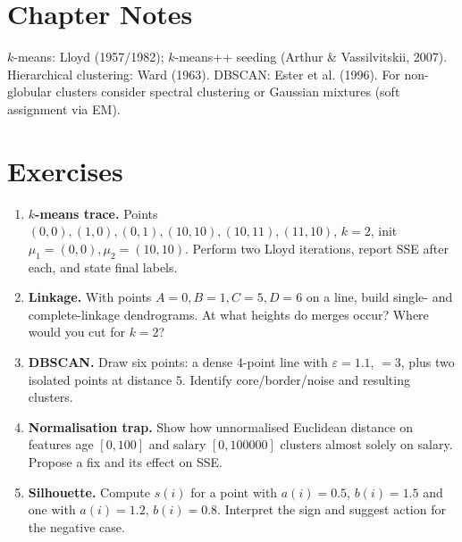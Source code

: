 \section{Chapter Notes}
$k$-means: Lloyd (1957/1982); $k$-means++ seeding (Arthur \& Vassilvitskii, 2007). Hierarchical clustering: Ward (1963). DBSCAN: Ester et al. (1996). For non-globular clusters consider spectral clustering or Gaussian mixtures (soft assignment via EM).

\section{Exercises}
\begin{enumerate}[label=E5.\arabic*, leftmargin=*, itemsep=0.6em]
    \item \textbf{$k$-means trace.} Points $(0,0),(1,0),(0,1),(10,10),(10,11),(11,10)$, $k=2$, init $\mu_1=(0,0),\mu_2=(10,10)$. Perform two Lloyd iterations, report SSE after each, and state final labels.
    \item \textbf{Linkage.} With points $A=0,B=1,C=5,D=6$ on a line, build single- and complete-linkage dendrograms. At what heights do merges occur? Where would you cut for $k=2$?
    \item \textbf{DBSCAN.} Draw six points: a dense 4-point line with $\varepsilon=1.1$, $=3$, plus two isolated points at distance $5$. Identify core/border/noise and resulting clusters.
    \item \textbf{Normalisation trap.} Show how unnormalised Euclidean distance on features age $[0,100]$ and salary $[0,100000]$ clusters almost solely on salary. Propose a fix and its effect on SSE.
    \item \textbf{Silhouette.} Compute $s(i)$ for a point with $a(i)=0.5$, $b(i)=1.5$ and one with $a(i)=1.2$, $b(i)=0.8$. Interpret the sign and suggest action for the negative case.
\end{enumerate}
